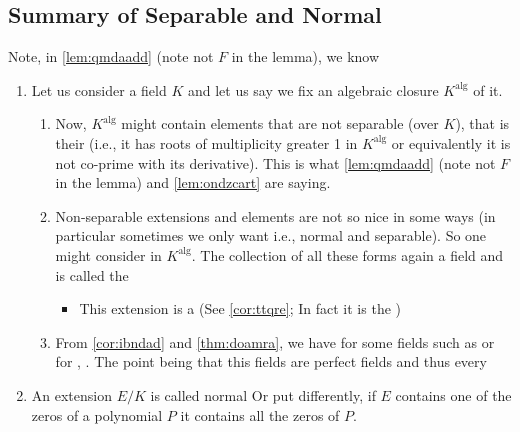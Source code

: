 \documentclass{article}
\begin{document}
\subsection{Summary of Separable and Normal}
\begin{rema}
Note, in \cref{lem:qmdaadd} (note not $F$ in the lemma), we know 
\end{rema}
\begin{enumerate}
    \item Let us consider a field $K$ and let us say we fix an algebraic closure $K^{\text{alg}}$ of it.
    \begin{enumerate}
        \item Now, $K^{\text{alg}}$ might contain elements that are not separable (over $K$), that is their  (i.e., it has roots of multiplicity greater 1 in $K^{\text{alg}}$ or equivalently it is not co-prime with its derivative). This is what \cref{lem:qmdaadd} (note not $F$ in the lemma) and \cref{lem:ondzcart} are saying.
        \item Non-separable extensions and elements are not so nice in some ways (in particular sometimes we only want  i.e., normal and separable). So one might consider  in $K^{\text{alg}}$. The collection of all these forms again a field and is called the 
        \begin{itemize}
            \item This extension is a  (See \cref{cor:ttqre}; In fact it is the )
        \end{itemize}
       \item From \cref{cor:ibndad} and \cref{thm:doamra}, we have for some fields such as  or for , . The point being that this fields are perfect fields and thus every 
    \end{enumerate}
    \item  {} An extension $E/K$ is called normal  Or put differently, if $E$ contains one of the zeros of a polynomial $P$ it contains all the zeros of $P$. 
\end{enumerate}
\end{document}
